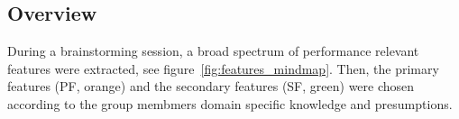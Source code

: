 \documentclass[a4paper]{article}
\begin{document}
\subsection{Overview}

During a brainstorming session, a broad spectrum of performance relevant features were extracted, see figure~\ref{fig:features_mindmap}. Then, the primary features (PF, orange) and the secondary features (SF, green) were chosen according to the group membmers domain specific knowledge and presumptions.



    
\end{document}
